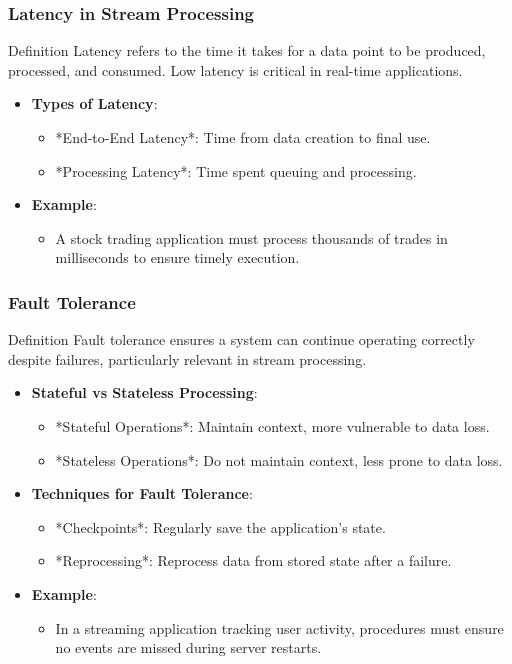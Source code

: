 \documentclass[aspectratio=169]{beamer}
\begin{document}
\begin{frame}[fragile]
    \frametitle{Latency in Stream Processing}
    \begin{block}{Definition}
        Latency refers to the time it takes for a data point to be produced, processed, and consumed. Low latency is critical in real-time applications.
    \end{block}
    \begin{itemize}
        \item \textbf{Types of Latency}:
            \begin{itemize}
                \item *End-to-End Latency*: Time from data creation to final use.
                \item *Processing Latency*: Time spent queuing and processing.
            \end{itemize}
        \item \textbf{Example}:
            \begin{itemize}
                \item A stock trading application must process thousands of trades in milliseconds to ensure timely execution.
            \end{itemize}
    \end{itemize}
\end{frame}

\begin{frame}[fragile]
    \frametitle{Fault Tolerance}
    \begin{block}{Definition}
        Fault tolerance ensures a system can continue operating correctly despite failures, particularly relevant in stream processing.
    \end{block}
    \begin{itemize}
        \item \textbf{Stateful vs Stateless Processing}:
            \begin{itemize}
                \item *Stateful Operations*: Maintain context, more vulnerable to data loss.
                \item *Stateless Operations*: Do not maintain context, less prone to data loss.
            \end{itemize}
        \item \textbf{Techniques for Fault Tolerance}:
            \begin{itemize}
                \item *Checkpoints*: Regularly save the application's state.
                \item *Reprocessing*: Reprocess data from stored state after a failure.
            \end{itemize}
        \item \textbf{Example}:
            \begin{itemize}
                \item In a streaming application tracking user activity, procedures must ensure no events are missed during server restarts.
            \end{itemize}
    \end{itemize}
\end{frame}
\end{document}
